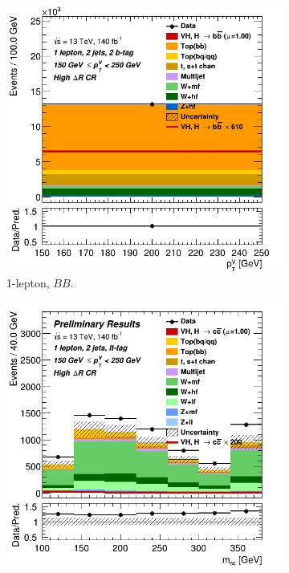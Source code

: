 \begin{figure}[h!]
  \centering
  \begin{subfigure}[b]{0.32\textwidth}
      \centering
      \includegraphics[width=\textwidth]{Images/VH/Own_fit/prefit_VHbb/Region_distpTV_BMax250_BMin150_DCRHigh_J2_TTypebb_T2_L1_Y6051_Prefit.png}
      \caption{1-lepton, $BB$.}
      \label{fig:plots_VHcc_ex_OL_CRH}
  \end{subfigure}
  \begin{subfigure}[b]{0.32\textwidth}
      \centering
      \includegraphics[width=\textwidth]{Images/VH/Own_fit/prefit_VHcc/Region_distmBB_BMax250_BMin150_DCRHigh_J2_TTypelt_T2_L1_Y6051_Prefit.png}

\end{subfigure}
\end{figure}
